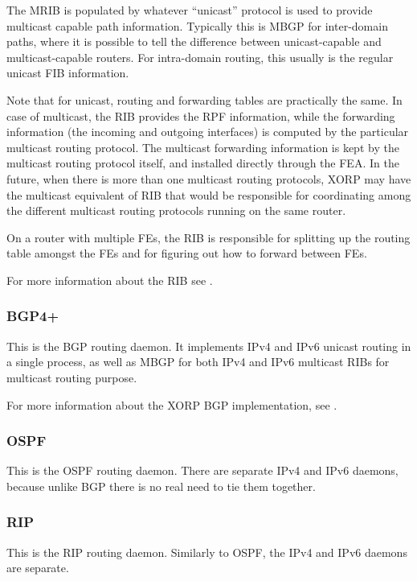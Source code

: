 \documentclass[11pt]{article}
\begin{document}
The MRIB is populated by whatever ``unicast'' protocol is used to
provide multicast capable path information. Typically this is
MBGP for inter-domain paths, where it is possible to tell the
difference between unicast-capable and multicast-capable routers.  For
intra-domain routing, this usually is the regular unicast FIB
information.

Note that for unicast, routing and forwarding tables are practically the
same. In case of multicast, the RIB provides the RPF information, while
the forwarding information (the incoming and outgoing interfaces) is
computed by the particular multicast routing protocol. The multicast
forwarding information is kept by the multicast routing protocol itself, and
installed directly through the FEA. In the future, when there is more
than one multicast routing protocols, XORP may have the multicast
equivalent of RIB that would be responsible for coordinating among the
different multicast routing protocols running on the same router.

On a router with multiple FEs, the RIB is responsible for splitting
up the routing table amongst the FEs and for figuring out how to forward
between FEs.

For more information about the RIB see \cite{xorp:rib}.

\subsubsection{BGP4+}

This is the BGP routing daemon. It implements IPv4 and IPv6 unicast
routing in a single process, as well as MBGP for both IPv4 and IPv6
multicast RIBs for multicast routing purpose.

For more information about the XORP BGP implementation, see \cite{xorp:bgp}.

\subsubsection{OSPF}

This is the OSPF routing daemon. There are separate IPv4 and IPv6
daemons, because unlike BGP there is no real need to tie them together.

\subsubsection{RIP}

This is the RIP routing daemon. Similarly to OSPF, the IPv4 and IPv6
daemons are separate.
\end{document}
